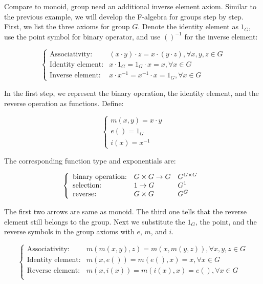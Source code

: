 \documentclass{article}
\begin{document}
\begin{example}
\normalfont
Compare to monoid, group need an additional inverse element axiom. Similar to the previous example, we will develop the F-algebra for groups step by step. First, we list the three axioms for group $G$. Denote the identity element as $1_G$, use the point symbol for binary operator, and use $()^{-1}$ for the inverse element:

\[
\begin{cases}
\text{Associativity:} & (x \cdot y) \cdot z = x \cdot (y \cdot z), \forall x, y, z \in G \\
\text{Identity element:} & x \cdot 1_G = 1_G \cdot x = x, \forall x \in G \\
\text{Inverse element:} & x \cdot x^{-1} = x^{-1} \cdot x = 1_G, \forall x \in G
\end{cases}
\]

In the first step, we represent the binary operation, the identity element, and the reverse operation as functions. Define:

\[
\begin{cases}
m (x, y) = x \cdot y \\
e () = 1_G \\
i (x) = x^{-1}
\end{cases}
\]

The corresponding function type and exponentials are:

\[
  \left \{
    \begin{array}{lll}
      \text{binary operation:} & G \times G \to G & G^{G \times G}\\
      \text{selection:} & 1 \to G & G^1 \\
      \text{reverse:} & G \times G & G^G \\
    \end{array}
  \right . \\
\]

The first two arrows are same as monoid. The third one tells that the reverse element still belongs to the group. Next we substitute the $1_G$, the point, and the reverse symbols in the group axioms with $e$, $m$, and $i$.

\[
\begin{cases}
\text{Associativity:} & m(m(x, y), z) = m(x, m(y, z)), \forall x, y, z \in G \\
\text{Identity element:} & m(x, e()) = m(e(), x) = x, \forall x \in G \\
\text{Reverse element:} & m(x, i(x)) = m(i(x), x) = e(), \forall x \in G \\
\end{cases}
\]


\end{example}
\end{document}
